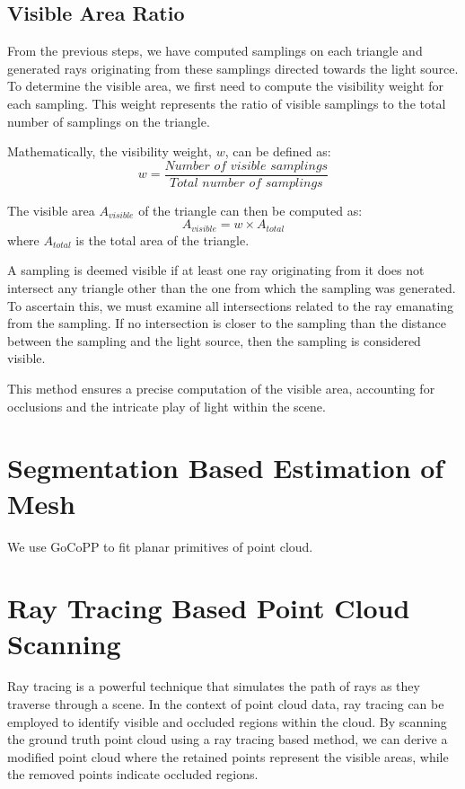 \documentclass[11pt, a4paper,oneside,chapterprefix=false]{scrbook}
\begin{document}
\subsection{Visible Area Ratio}

From the previous steps, we have computed samplings on each triangle and generated rays originating from these samplings directed towards the light source. To determine the visible area, we first need to compute the visibility weight for each sampling. This weight represents the ratio of visible samplings to the total number of samplings on the triangle.

\vspace{10pt}

Mathematically, the visibility weight, \( w \), can be defined as:
\[ 
    w = \frac{\textit{Number of visible samplings}}{\textit{Total number of samplings}}
\]

The visible area \( A_{\textit{visible}} \) of the triangle can then be computed as:
\[ 
    A_{\textit{visible}} = w \times A_{\textit{total}}
\]
where \( A_{\textit{total}} \) is the total area of the triangle.

A sampling is deemed visible if at least one ray originating from it does not intersect any triangle other than the one from which the sampling was generated. To ascertain this, we must examine all intersections related to the ray emanating from the sampling. If no intersection is closer to the sampling than the distance between the sampling and the light source, then the sampling is considered visible.

\vspace{10pt}

This method ensures a precise computation of the visible area, accounting for occlusions and the intricate play of light within the scene.
 
\section{Segmentation Based Estimation of Mesh} \label{sec:segmentation mesh estimation}

We use GoCoPP to fit planar primitives of point cloud.


\section{Ray Tracing Based Point Cloud Scanning} \label{sec:ray tracing point cloud scanning}

Ray tracing is a powerful technique that simulates the path of rays as they traverse through a scene. In the context of point cloud data, ray tracing can be employed to identify visible and occluded regions within the cloud. By scanning the ground truth point cloud using a ray tracing based method, we can derive a modified point cloud where the retained points represent the visible areas, while the removed points indicate occluded regions.
\end{document}
